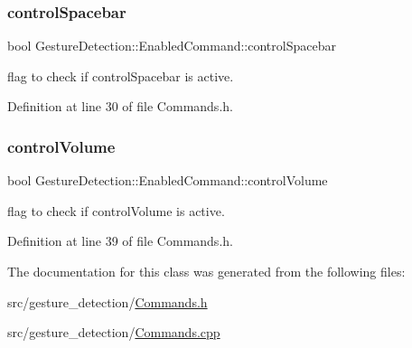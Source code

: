 \subsubsection{\texorpdfstring{control\+Spacebar}{controlSpacebar}}
{\footnotesize\ttfamily bool Gesture\+Detection\+::\+Enabled\+Command\+::control\+Spacebar}



flag to check if control\+Spacebar is active. 



Definition at line 30 of file Commands.\+h.

\mbox{\label{class_gesture_detection_1_1_enabled_command_a8d2542571d224cdca24f428bc066215f}} 
\subsubsection{\texorpdfstring{control\+Volume}{controlVolume}}
{\footnotesize\ttfamily bool Gesture\+Detection\+::\+Enabled\+Command\+::control\+Volume}



flag to check if control\+Volume is active. 



Definition at line 39 of file Commands.\+h.



The documentation for this class was generated from the following files\+:\begin{DoxyCompactItemize}
\item 
src/gesture\+\_\+detection/\hyperlink{_commands_8h}{Commands.\+h}\item 
src/gesture\+\_\+detection/\hyperlink{_commands_8cpp}{Commands.\+cpp}\end{DoxyCompactItemize}

